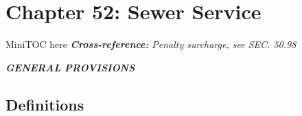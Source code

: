 \documentclass[code.tex]{subfiles}
\begin{document}
\chapter*{Chapter 52: \newline
	Sewer Service}

MiniTOC here\newline
\textbf{\emph{{Cross-reference:}}}\newline
\emph{Penalty surcharge, see SEC. 50.98}
\pagebreak


\begin{center}
\emph{\textbf{\LARGE{GENERAL PROVISIONS}}}
\end{center}

\section{Definitions}
\end{document}
